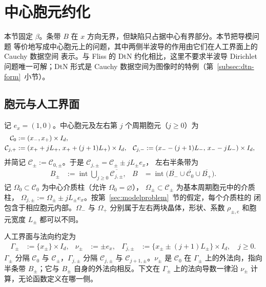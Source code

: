 \section{中心胞元约化}
\label{sec:reduction}

本节固定 $\beta$。条带 $B$ 在 $x$ 方向无界，但缺陷只占据中心有界部分。本节把导模问题
等价地写成中心胞元上的问题，其中两侧半波导的作用由它们在人工界面上的 Cauchy 数据空间
表示。与 Fliss 的 DtN 约化\cite[定理~4.5]{Fliss2013}相比，这里不要求半波导 Dirichlet
问题唯一可解；DtN 形式是 Cauchy 数据空间为图像时的特例（第~\ref{subsec:dtn-form}~小节）。

\subsection{胞元与人工界面}
\label{subsec:cells}

记 $e_x=(1,0)$。中心胞元及左右第 $j$ 个周期胞元（$j\geq0$）为
\begin{align}
  \mathcal C_0&:=(x_-,x_+)\times I_d,
  \notag\\
  \mathcal C_{j,+}&:=(x_++jL_+,\,x_++(j+1)L_+)\times I_d,
  &\mathcal C_{j,-}&:=(x_--(j+1)L_-,\,x_--jL_-)\times I_d,
  \label{eq:cells}
\end{align}
并简记 $\mathcal C_\pm:=\mathcal C_{0,\pm}$。于是 $\mathcal C_{j,\pm}=\mathcal C_\pm\pm jL_\pm e_x$，
左右半条带为
\begin{align}
  B_\pm
  &:=\operatorname{int}\bigcup_{j\geq0}\overline{\mathcal C_{j,\pm}},
  &B&=\operatorname{int}\bigl(\overline{B_-}\cup\overline{\mathcal C_0}\cup\overline{B_+}\bigr).
  \label{eq:half-guides}
\end{align}
记 $\Omega_0\subset\mathcal C_0$ 为中心介质柱（允许 $\Omega_0=\varnothing$），
$\Omega_\pm\subset\mathcal C_\pm$ 为基本周期胞元中的介质柱，
$\Omega_{j,\pm}:=\Omega_\pm\pm jL_\pm e_x$。按第~\ref{sec:modelproblem}~节的假定，每个介质柱的
闭包含于相应胞元内部。$\Omega_-$ 与 $\Omega_+$
分别属于左右两块晶体，形状、系数 $\rho_{\pm,\mathrm c}$ 和胞元宽度 $L_\pm$ 都可以不同。

人工界面与法向约定为
\begin{align}
  \Gamma_\pm&:=\{x_\pm\}\times I_d,
  &\nu_\pm&:=\pm e_x,
  &\Gamma_{j,\pm}&:=\{x_\pm\pm(j+1)L_\pm\}\times I_d,\quad j\geq0.
  \label{eq:artificial-interfaces}
\end{align}
$\Gamma_\pm$ 分隔 $\mathcal C_0$ 与 $\mathcal C_\pm$，$\Gamma_{j,\pm}$ 分隔
$\mathcal C_{j,\pm}$ 与 $\mathcal C_{j+1,\pm}$。$\nu_\pm$ 是 $\mathcal C_0$ 在
$\Gamma_\pm$ 上的外法向，指向半条带 $B_\pm$；它与 $B_\pm$ 自身的外法向相反。下文在
$\Gamma_\pm$ 上的法向导数一律沿 $\nu_\pm$ 计算，无论函数定义在哪一侧。

